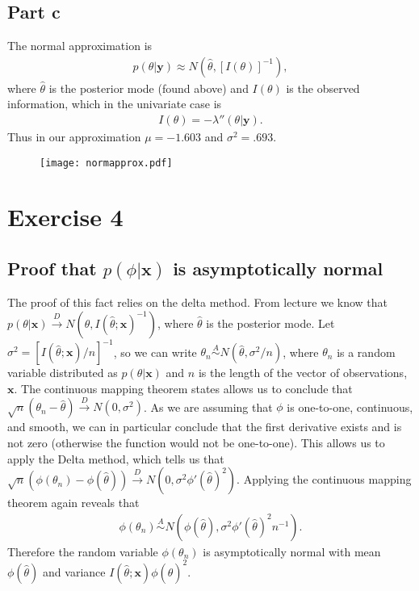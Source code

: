 \documentclass[a4paper,10pt]{article}
\newcommand{\by}{\mathbf{y}}
\newcommand{\bx}{\mathbf{x}}
\begin{document}
\subsection{Part c}
The normal approximation is
\begin{align*}
 p(\theta|\by) \approx N(\hat{\theta}, [I(\theta)]^{-1}),
\end{align*}
where $\hat{\theta}$ is the posterior mode (found above) and $I(\theta)$ is the observed information, which in the univariate case is
\begin{align*}
 I(\theta) = -\lambda''(\theta|\by).
\end{align*}
Thus in our approximation $\mu = -1.603$ and $\sigma^2 = .693$.  
\begin{figure}
\centering
\texttt{[image: normapprox.pdf]}
\end{figure}

\section{Exercise 4}
\subsection{Proof that $p(\phi|\bx)$ is asymptotically normal}
The proof of this fact relies on the delta method. From lecture we know that $p(\theta|\bx) \overset{D}{\rightarrow} N(\hat{\theta}, I(\hat{\theta};\bx)^{-1})$, where $\hat{\theta}$ is the posterior mode.  Let $\sigma^{2}=[I(\hat{\theta};\bx)/n]^{-1}$, so we can write $\theta_{n} \overset{A}{\sim} N(\hat{\theta}, \sigma^{2}/n)$, where $\theta_{n}$ is a random variable distributed as $p(\theta|\bx)$ and $n$ is the length of the vector of observations, $\bx$.   The continuous mapping theorem states allows us to conclude that $\sqrt{n}(\theta_{n}-\hat{\theta}) \overset{D}{\rightarrow} N(0, \sigma^{2})$.  As we are assuming that $\phi$ is one-to-one, continuous, and smooth, we can in particular conclude that the first derivative exists and is not zero (otherwise the function would not be one-to-one).  This allows us to apply the Delta method, which tells us that $\sqrt{n}(\phi(\theta_{n})-\phi(\hat{\theta})) \overset{D}{\rightarrow} N(0, \sigma^{2}\phi'(\hat{\theta})^{2})$.  Applying the continuous mapping theorem again reveals that
\begin{align*}
\phi(\theta_{n}) \overset{A}{\sim} N(\phi(\hat{\theta}), \sigma^{2}\phi'(\hat{\theta})^{2}n^{-1}).
\end{align*}
Therefore the random variable $\phi(\theta_{n})$ is asymptotically normal with mean $\phi(\hat{\theta})$ and variance $I(\hat{\theta};\bx)\phi(\hat{\theta})^{2}$.  
\end{document}
